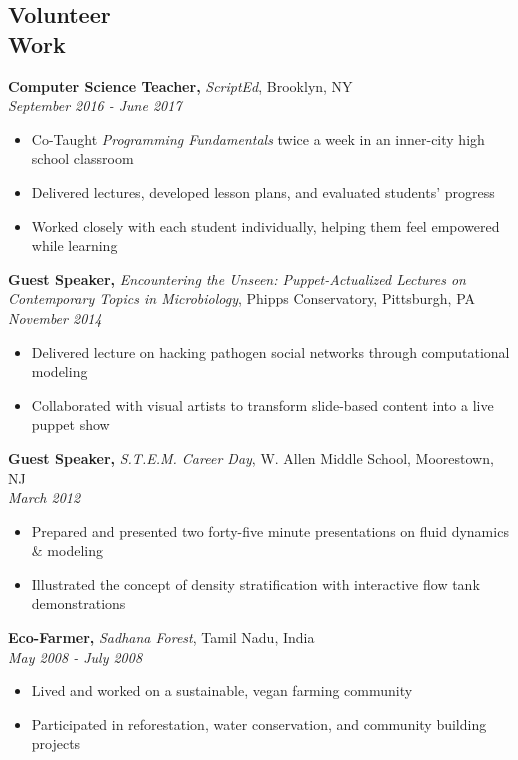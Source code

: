 \documentclass[margin]{res}
\begin{document}
\begin{resume}
\section{Volunteer \\ Work}
{\bf Computer Science Teacher,} \emph{ScriptEd}, Brooklyn, NY\\ \hfill
\emph{September 2016 - June 2017}
\begin{itemize} \itemsep -2pt
\item Co-Taught \emph{Programming Fundamentals} twice a week in an inner-city high school classroom
\item Delivered lectures, developed lesson plans, and evaluated students' progress
  \item Worked closely with each student individually, helping them feel empowered while learning
  \end{itemize}

{\bf Guest Speaker,} \emph{Encountering the Unseen: Puppet-Actualized Lectures on Contemporary Topics in Microbiology}, Phipps Conservatory, Pittsburgh, PA\\ \hfill
  \emph{November 2014}
\begin{itemize} \itemsep -2pt
  \item Delivered lecture on hacking pathogen social networks through computational modeling
  \item Collaborated with visual artists to transform slide-based content into a live puppet show
\end{itemize}

{\bf Guest Speaker,} \emph{S.T.E.M. Career Day}, W. Allen Middle School, Moorestown, NJ \\    \hfill \emph{March 2012}
\begin{itemize} \itemsep -2pt
\item Prepared and presented two forty-five minute presentations on fluid dynamics \& modeling
  \item Illustrated the  concept of density stratification with interactive flow tank demonstrations
	     \end{itemize}

{\bf Eco-Farmer,} \emph{Sadhana Forest}, Tamil Nadu, India\\ \hfill   		\emph{May 2008 - July 2008}
               \begin{itemize} \itemsep -2pt
                \item Lived and worked on a sustainable, vegan farming community
                \item Participated in reforestation, water conservation, and community building projects
		 \end{itemize}




\end{resume}
\end{document}
